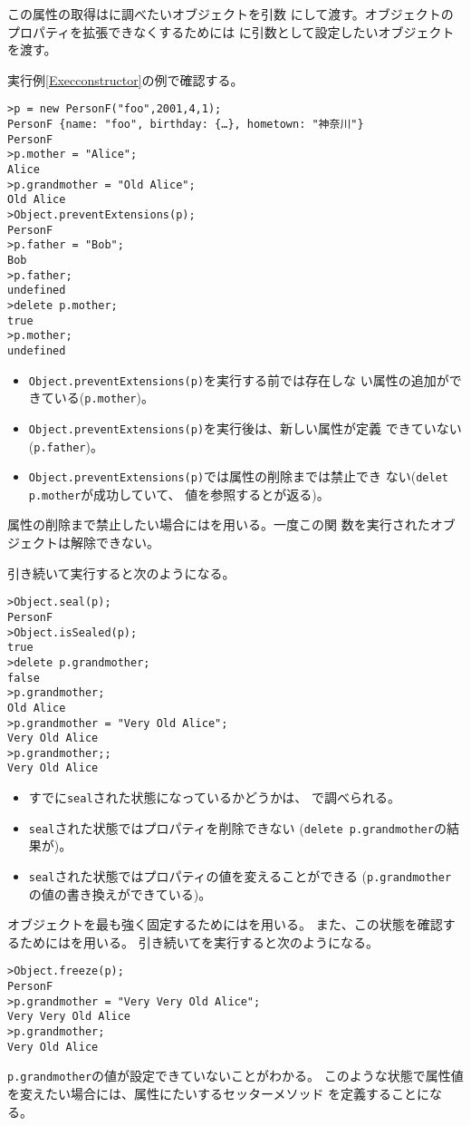 この属性の取得はに調べたいオブジェクトを引数
にして渡す。オブジェクトのプロパティを拡張できなくするためには
に引数として設定したいオブジェクトを渡す。
 \begin{Exec}\upshape\label{ExecconstructorExtensible}
  実行例\ref{Execconstructor}の例で確認する。
\begin{Verbatim}
>p = new PersonF("foo",2001,4,1);
PersonF {name: "foo", birthday: {…}, hometown: "神奈川"}
PersonF
>p.mother = "Alice";
Alice
>p.grandmother = "Old Alice";
Old Alice
>Object.preventExtensions(p);
PersonF
>p.father = "Bob";
Bob
>p.father;
undefined
>delete p.mother;
true
>p.mother;
undefined
\end{Verbatim}
\begin{itemize}
 \item \texttt{Object.preventExtensions(p)}を実行する前では存在しな
       い属性の追加ができている(\texttt{p.mother})。
 \item \texttt{Object.preventExtensions(p)}を実行後は、新しい属性が定義
			 できていない(\texttt{p.father})。
 \item \texttt{Object.preventExtensions(p)}では属性の削除までは禁止でき
       ない(\texttt{delet p.mother}が成功していて、
			 値を参照するとが返る)。
\end{itemize}
属性の削除まで禁止したい場合にはを用いる。一度この関
数を実行されたオブジェクトは解除できない。
	
引き続いて実行すると次のようになる。
\begin{Verbatim}
>Object.seal(p);
PersonF
>Object.isSealed(p);
true
>delete p.grandmother;
false
>p.grandmother;
Old Alice
>p.grandmother = "Very Old Alice";
Very Old Alice
>p.grandmother;;
Very Old Alice
\end{Verbatim}
\begin{itemize}
	 \item すでに\texttt{seal}された状態になっているかどうかは、
				 で調べられる。
 \item \texttt{seal}された状態ではプロパティを削除できない
			 (\texttt{delete p.grandmother}の結果が)。
 \item \texttt{seal}された状態ではプロパティの値を変えることができる
			 (\texttt{p.grandmother}の値の書き換えができている)。
\end{itemize}
オブジェクトを最も強く固定するためにはを用いる。
また、この状態を確認するためにはを用いる。
%
引き続いてを実行すると次のようになる。
\begin{Verbatim}
>Object.freeze(p);
PersonF
>p.grandmother = "Very Very Old Alice";
Very Very Old Alice
>p.grandmother;
Very Old Alice
\end{Verbatim}
 \texttt{p.grandmother}の値が設定できていないことがわかる。
このような状態で属性値を変えたい場合には、属性にたいするセッターメソッド
  を定義することになる。


\end{Exec}

